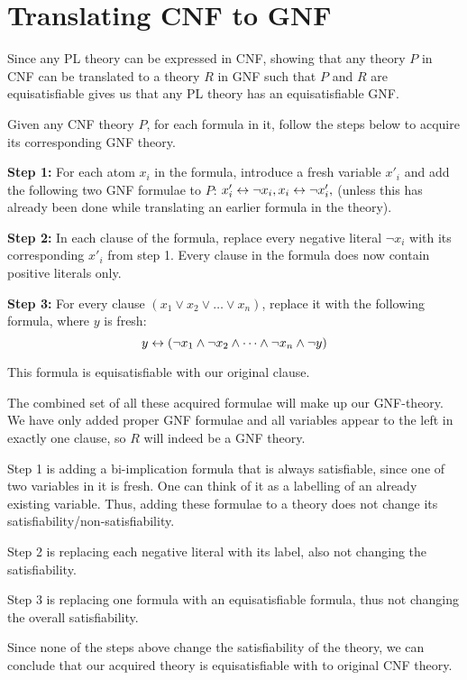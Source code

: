 \section{Translating CNF to GNF}
\label{sec:Translating CNF to GNF}
Since any PL theory can be expressed in CNF, showing that any theory $P$ in CNF can be translated to a theory $R$ in GNF such that $P$ and $R$ are equisatisfiable gives us that any PL theory has an equisatisfiable GNF.

Given any CNF theory $P$, for each formula in it, follow the steps below to acquire its corresponding GNF theory.

\textbf{Step 1:}
For each atom $x_i$ in the formula, introduce a fresh variable $x'_i$ and add the following two GNF formulae to $P$:
$x'_i \leftrightarrow \neg x_i, x_i \leftrightarrow \neg x'_i,$ (unless this has already been done while translating an earlier formula in the theory).

\textbf{Step 2:}
In each clause of the formula, replace every negative literal $\neg x_i$ with its corresponding $x'_i$ from step 1.
Every clause in the formula does now contain positive literals only.

\textbf{Step 3:}
For every clause $(x_1 \vee x_2 \vee \dots \vee x_n)$, replace it with the following formula, where $y$ is fresh:
\[y \leftrightarrow (\neg x_1 \wedge \neg x_2 \wedge \dots \wedge \neg x_n \wedge \neg y)\]

This formula is equisatisfiable with our original clause.

The combined set of all these acquired formulae will make up our GNF-theory.
We have only added proper GNF formulae and all variables appear to the left in exactly one clause, so $R$ will indeed be a GNF theory.

Step 1 is adding a bi-implication formula that is always satisfiable, since one of two variables in it is fresh.
One can think of it as a labelling of an already existing variable.
Thus, adding these formulae to a theory does not change its satisfiability/non-satisfiability.

Step 2 is replacing each negative literal with its label, also not changing the satisfiability.

Step 3 is replacing one formula with an equisatisfiable formula, thus not changing the overall satisfiability.

Since none of the steps above change the satisfiability of the theory, we can conclude that our acquired theory is equisatisfiable with to original CNF theory.

